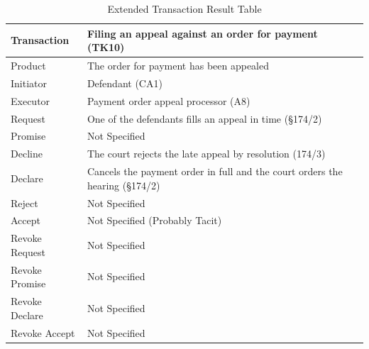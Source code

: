 \begin{landscape}
\begin{table}[h]
\caption{Extended Transaction Result Table}
\label{tab:etrt}
\begin{tabular}{|l||l|l|}
\hline
Transaction  &  Filing an appeal against an order for payment (TK10) \\ \hline
Product      &  The order for payment has been appealed \\ \hline
Initiator      &  Defendant (CA1)  \\ \hline
Executor       &  Payment order appeal processor (A8) \\ \hline
Request        & One of the defendants fills an appeal in time (\S174/2)
  \\ \hline
Promise        &    Not Specified   \\ \hline
Decline        & The court rejects the late appeal by resolution (174/3)  \\ \hline
Declare        &  Cancels the payment order in full and the court orders the hearing (\S174/2)  \\ \hline
Reject         &  Not Specified   \\ \hline
Accept         & Not Specified (Probably Tacit) \\ \hline
Revoke Request & Not Specified \\ \hline
Revoke Promise & Not Specified  \\ \hline
Revoke Declare & Not Specified      \\ \hline
Revoke Accept  &  Not Specified \\ \hline
\end{tabular}
\end{table}


\end{landscape}
